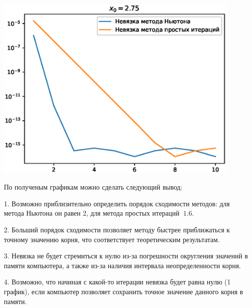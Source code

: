 \includegraphics[width=12cm]{222_2.eps}

По полученым графикам можно сделать следующий вывод:

1. Возможно приблизительно определить порядок сходимости методов: для метода Ньютона он равен 2, для метода простых итераций $~1.6$.

2. Больший порядок сходимости позволяет методу быстрее приближаться к точному значению корня, что соответствует теоретическим результатам.

3. Невязка не будет стремиться к нулю из-за погрешности округления значений в памяти компьютера, а также из-за наличия интервала неопределенности корня.

4. Возможно, что начиная с какой-то итерации невязка будет равна нулю (1 график), если компьютер позволяет сохранить точное значение данного корня в памяти.
